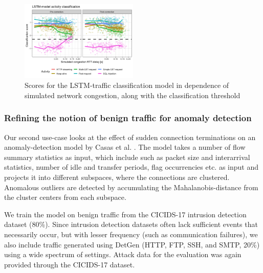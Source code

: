 \documentclass[sigconf]{acmart}
\begin{document}

\begin{figure}
\centering
\includegraphics[width=0.5\textwidth]{images/LSTM_exp.png}
\caption{Scores for the LSTM-traffic classification model in dependence of simulated network congestion, along with the classification threshold}\label{fig:LSTM_exp}
\end{figure}

\subsubsection{Refining the notion of benign traffic for anomaly detection}

Our second use-case looks at the effect of sudden connection terminations on an anomaly-detection model by Casas et al. \cite{casas2012unsupervised}. The model takes a number of flow summary statistics as input, which include such as packet size and interarrival statistics, number of idle and transfer periods, flag occurrencies etc. as input and projects it into different subspaces, where the connections are clustered. Anomalous outliers are detected by accumulating the Mahalanobis-distance from the cluster centers from each subspace.

We train the model on benign traffic from the CICIDS-17 intrusion detection dataset (80\%). Since intrusion detection datasets often lack sufficient events that necessarily occur, but with lesser frequency (such as communication failures), we also include traffic generated using DetGen (HTTP, FTP, SSH, and SMTP, 20\%) using a wide spectrum of settings. Attack data for the evaluation was again provided through the CICIDS-17 dataset.
\end{document}
